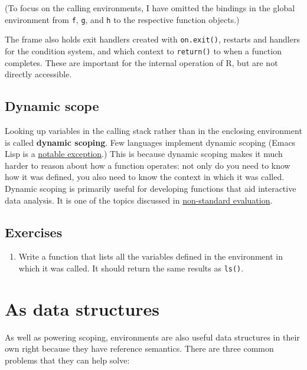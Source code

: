 \documentclass[]{book}
\providecommand{\tightlist}{%
  \setlength{\itemsep}{0pt}\setlength{\parskip}{0pt}}
\theoremstyle{definition}
\theoremstyle{definition}
\theoremstyle{definition}
\theoremstyle{remark}
\begin{document}
(To focus on the calling environments, I have omitted the bindings in
the global environment from \texttt{f}, \texttt{g}, and \texttt{h} to
the respective function objects.)

The frame also holds exit handlers created with \texttt{on.exit()},
restarts and handlers for the condition system, and which context to
\texttt{return()} to when a function completes. These are important for
the internal operation of R, but are not directly accessible.

\subsection{Dynamic scope}\label{dynamic-scope}

Looking up variables in the calling stack rather than in the enclosing
environment is called \textbf{dynamic scoping}. Few languages implement
dynamic scoping (Emacs Lisp is a
\href{http://www.gnu.org/software/emacs/emacs-paper.html\#SEC15}{notable
exception}.) This is because dynamic scoping makes it much harder to
reason about how a function operates: not only do you need to know how
it was defined, you also need to know the context in which it was
called. Dynamic scoping is primarily useful for developing functions
that aid interactive data analysis. It is one of the topics discussed in
\protect\hyperlink{nse}{non-standard evaluation}.

\subsection{Exercises}\label{exercises-9}

\begin{enumerate}
\def\labelenumi{\arabic{enumi}.}
\tightlist
\item
  Write a function that lists all the variables defined in the
  environment in which it was called. It should return the same results
  as \texttt{ls()}.
\end{enumerate}

\hypertarget{explicit-envs}{\section{As data
structures}\label{explicit-envs}}

As well as powering scoping, environments are also useful data
structures in their own right because they have reference semantics.
There are three common problems that they can help solve:
\end{document}
